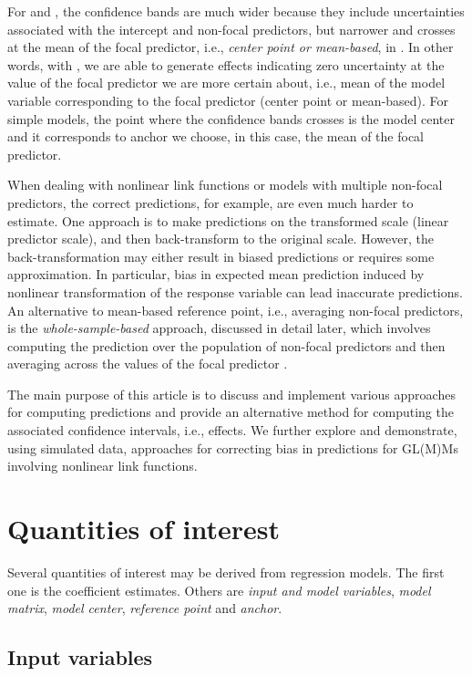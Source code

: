 For  and , the confidence bands are much wider because they include uncertainties associated with the intercept and non-focal predictors, but narrower and crosses at the mean of the focal predictor, i.e., \emph{center point or mean-based}, in . In other words, with , we are able to generate effects indicating zero uncertainty at the value of the focal predictor we are more certain about, i.e., mean of the model variable corresponding to the focal predictor (center point or mean-based). For simple models, the point where the confidence bands crosses is the model center and it corresponds to anchor we choose, in this case, the mean of the focal predictor.


When dealing with nonlinear link functions or models with multiple non-focal predictors, the correct predictions, for example, are even much harder to estimate. One approach is to make predictions on the transformed scale (linear predictor scale), and then back-transform to the original scale. However, the back-transformation may either result in biased predictions or requires some approximation. In particular, bias in expected mean prediction induced by nonlinear transformation of the response variable can lead inaccurate predictions. An alternative to mean-based reference point, i.e., averaging non-focal predictors, is the \emph{whole-sample-based} approach, discussed in detail later, which involves computing the prediction over the population of non-focal predictors and then averaging across the values of the focal predictor \citep{hanmer2013behind}. 


The main purpose of this article is to discuss and implement various approaches for computing predictions and provide an alternative method for computing the associated confidence intervals, i.e., effects. We further explore and demonstrate, using simulated data, approaches for correcting bias in predictions for GL(M)Ms involving nonlinear link functions.


\section*{Quantities of interest}

Several quantities of interest may be derived from regression models. The first one is the coefficient estimates. Others are \emph{input and model variables}, \emph{model matrix}, \emph{model center}, \emph{reference point} and \emph{anchor}.

\subsection*{Input variables}

